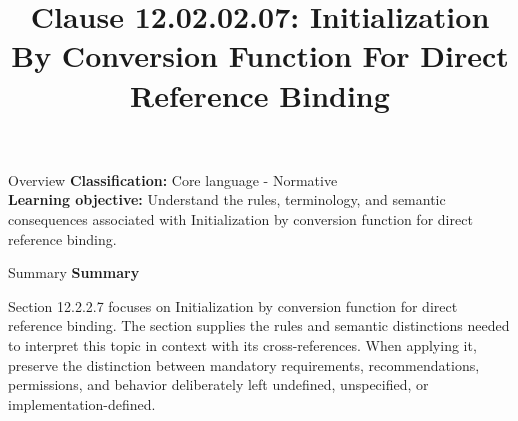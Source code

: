 \documentclass[10pt,letterpaper]{article}
\title{Clause 12.02.02.07: Initialization By Conversion Function For Direct Reference Binding}
\author{}
\date{}
\begin{document}
\maketitle
\begin{CornellOverviewBox}{Overview}
\textbf{Classification:} Core language - Normative\\[2pt]
\textbf{Learning objective:} Understand the rules, terminology, and semantic consequences associated with Initialization by conversion function for direct reference binding.
\end{CornellOverviewBox}\begin{CornellSummaryBox}{Summary}
{\sffamily\bfseries\color{Accent} Summary}\par\vspace{3pt}Section 12.2.2.7 focuses on Initialization by conversion function for direct reference binding. The section supplies the rules and semantic distinctions needed to interpret this topic in context with its cross-references. When applying it, preserve the distinction between mandatory requirements, recommendations, permissions, and behavior deliberately left undefined, unspecified, or implementation-defined.
\end{CornellSummaryBox}
\end{document}
